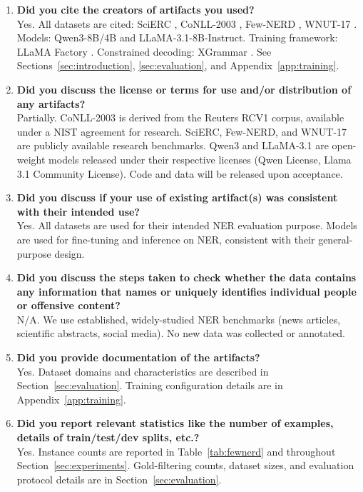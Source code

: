 \begin{enumerate}
\item[B1.] \textbf{Did you cite the creators of artifacts you used?}\\
Yes. All datasets are cited: SciERC \cite{luan2018scierc}, CoNLL-2003 \cite{tjongkimsang2003conll}, Few-NERD \cite{ding2021fewnerd}, WNUT-17 \cite{derczynski2017wnut}. Models: Qwen3-8B/4B and LLaMA-3.1-8B-Instruct. Training framework: LLaMA Factory \cite{zheng2024llamafactory}. Constrained decoding: XGrammar \cite{dong2024xgrammar}. See Sections~\ref{sec:introduction}, \ref{sec:evaluation}, and Appendix~\ref{app:training}.

\item[B2.] \textbf{Did you discuss the license or terms for use and/or distribution of any artifacts?}\\
Partially. CoNLL-2003 is derived from the Reuters RCV1 corpus, available under a NIST agreement for research. SciERC, Few-NERD, and WNUT-17 are publicly available research benchmarks. Qwen3 and LLaMA-3.1 are open-weight models released under their respective licenses (Qwen License, Llama 3.1 Community License). Code and data will be released upon acceptance.

\item[B3.] \textbf{Did you discuss if your use of existing artifact(s) was consistent with their intended use?}\\
Yes. All datasets are used for their intended NER evaluation purpose. Models are used for fine-tuning and inference on NER, consistent with their general-purpose design.

\item[B4.] \textbf{Did you discuss the steps taken to check whether the data contains any information that names or uniquely identifies individual people or offensive content?}\\
N/A. We use established, widely-studied NER benchmarks (news articles, scientific abstracts, social media). No new data was collected or annotated.

\item[B5.] \textbf{Did you provide documentation of the artifacts?}\\
Yes. Dataset domains and characteristics are described in Section~\ref{sec:evaluation}. Training configuration details are in Appendix~\ref{app:training}.

\item[B6.] \textbf{Did you report relevant statistics like the number of examples, details of train/test/dev splits, etc.?}\\
Yes. Instance counts are reported in Table~\ref{tab:fewnerd} and throughout Section~\ref{sec:experiments}. Gold-filtering counts, dataset sizes, and evaluation protocol details are in Section~\ref{sec:evaluation}.
\end{enumerate}


